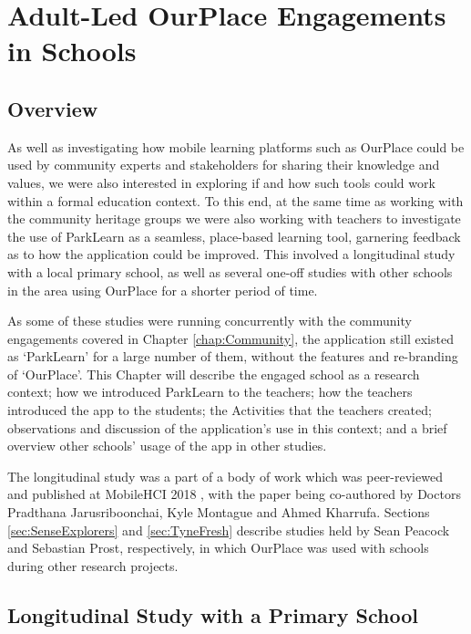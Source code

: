 \chapter{Adult-Led OurPlace Engagements in Schools}
\label{chap:Teachers}

\section{Overview}

As well as investigating how mobile learning platforms such as OurPlace could be used by community experts and stakeholders for sharing their knowledge and values, we were also interested in exploring if and how such tools could work within a formal education context. To this end, at the same time as working with the community heritage groups we were also working with teachers to investigate the use of ParkLearn as a seamless, place-based learning tool, garnering feedback as to how the application could be improved. This involved a longitudinal study with a local primary school, as well as several one-off studies with other schools in the area using OurPlace for a shorter period of time. 

As some of these studies were running concurrently with the community engagements covered in Chapter \ref{chap:Community}, the application still existed as `ParkLearn' for a large number of them, without the features and re-branding of `OurPlace'. This Chapter will describe the engaged school as a research context; how we introduced ParkLearn to the teachers; how the teachers introduced the app to the students; the Activities that the teachers created; observations and discussion of the application's use in this context; and a brief overview other schools' usage of the app in other studies.

The longitudinal study was a part of a body of work which was peer-reviewed and published at MobileHCI 2018 \citep{Richardson2018}, with the paper being co-authored by Doctors Pradthana Jarusriboonchai, Kyle Montague and Ahmed Kharrufa. Sections \ref{sec:SenseExplorers} and \ref{sec:TyneFresh} describe studies held by Sean Peacock and Sebastian Prost, respectively, in which OurPlace was used with schools during other research projects.

\section{Longitudinal Study with a Primary School}
\label{sec:LongitudinalSchool}

